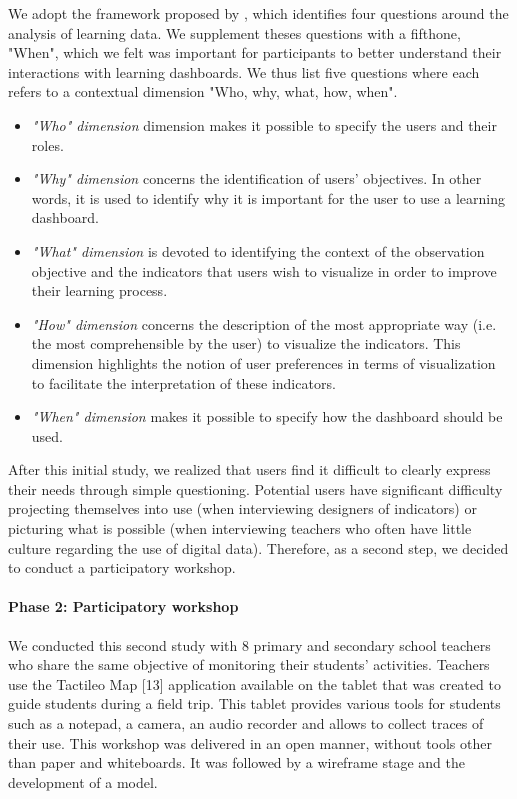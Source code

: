 \documentclass[manuscript,nonacm,12pt]{acmart}
\begin{document}
We adopt the framework proposed by \citet{chatti2012reference}, which identifies four questions around the analysis of learning data. We supplement theses questions with a fifthone, "When", which we felt was important for participants to better understand their interactions with learning dashboards. We thus list five questions where each refers to a contextual dimension "Who, why, what, how, when".
\begin{itemize}
    \item \textit{"Who" dimension}  dimension makes it possible to specify the users and their roles.
    \item \textit{"Why" dimension} concerns the identification of users' objectives. In other words, it is used to identify why it is important for the user to use a learning dashboard.
    \item \textit{"What" dimension}  is devoted to identifying the context of the observation objective and the indicators that users wish to visualize in order to improve their learning process.
    \item \textit{"How" dimension}  concerns the description of the most appropriate way (i.e. the most comprehensible by the user) to visualize the indicators. This dimension highlights the notion of user preferences in terms of visualization to facilitate the interpretation of these indicators.
    \item \textit{"When" dimension} makes it possible to specify how the dashboard should be used. 
\end{itemize}

After this initial study, we realized that users find it difficult to clearly express their needs through simple questioning. Potential users have significant difficulty projecting themselves into use (when interviewing designers of indicators) or picturing what is possible (when interviewing teachers who often have little culture regarding the use of digital data). Therefore, as a second step, we decided to conduct a participatory workshop.

\paragraph{Phase 2: Participatory workshop}
We conducted this second study with 8 primary and secondary school teachers who share the same objective of monitoring their students' activities. Teachers use the Tactileo Map [13] application available on the tablet that was created to guide students during a field trip. This tablet provides various tools for students such as a notepad, a camera, an audio recorder and allows to collect traces of their use. This workshop was delivered in an open manner, without tools other than paper and whiteboards. It was followed by a wireframe stage and the development of a model.
\end{document}

